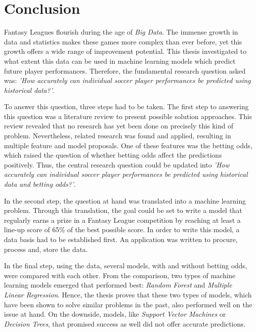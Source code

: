 \chapter{Conclusion}

Fantasy Leagues flourish during the age of \emph{Big Data}. The immense growth in data and statistics makes these games more complex than ever before, yet this growth offers a wide range of improvement potential. This thesis investigated to what extent this data can be used in machine learning models which predict future player performances. Therefore, the fundamental research question asked was: \emph{'How accurately can individual soccer player performances be predicted using historical data?'}.

To answer this question, three steps had to be taken. The first step to answering this question was a literature review to present possible solution approaches. This review revealed that no research has yet been done on precisely this kind of problem. Nevertheless, related research was found and applied, resulting in multiple feature and model proposals. One of these features was the betting odds, which raised the question of whether betting odds affect the predictions positively. Thus, the central research question could be updated into \emph{'How accurately can individual soccer player performances be predicted using historical data and betting odds?'}.

In the second step, the question at hand was translated into a machine learning problem. Through this translation, the goal could be set to write a model that regularly earns a prize in a Fantasy League competition by reaching at least a line-up score of 65\% of the best possible score. In order to write this model, a data basis had to be established first. An application was written to procure, process and, store the data.

\clearpage In the final step, using the data, several models, with and without betting odds, were compared with each other. From the comparison, two types of machine learning models emerged that performed best: \emph{Random Forest} and \emph{Multiple Linear Regression}. Hence, the thesis proves that these two types of models, which have been shown to solve similar problems in the past, also performed well on the issue at hand. On the downside, models, like \emph{Support Vector Machines} or \emph{Decision Trees}, that promised success as well did not offer accurate predictions. 

